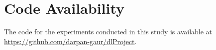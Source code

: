 \section{Code Availability}
\label{sec:code}
The code for the experiments conducted in this study is available at \url{https://github.com/darpan-gaur/dlProject}.